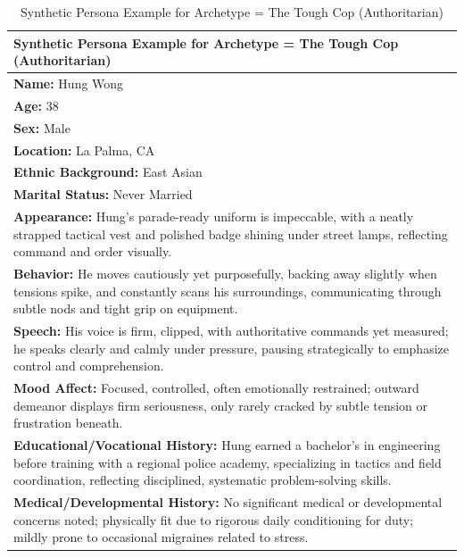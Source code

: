 \documentclass[11pt]{article}
\begin{document}
\begin{table}[ht]
\centering
\caption{Synthetic Persona Example for Archetype = The Tough Cop (Authoritarian)}
\label{tab:persona-example-2}
\scriptsize %
\begin{tabularx}{\textwidth}{X}
\toprule
\textbf{Synthetic Persona Example for Archetype = The Tough Cop (Authoritarian)} \\
\midrule
\textbf{Name:} Hung Wong \\
\textbf{Age:} 38 \\
\textbf{Sex:} Male \\
\textbf{Location:} La Palma, CA \\
\textbf{Ethnic Background:} East Asian \\
\textbf{Marital Status:} Never Married \\[4pt]

\textbf{Appearance:} Hung's parade-ready uniform is impeccable, with a neatly strapped tactical vest and polished badge shining under street lamps, reflecting command and order visually. \\[4pt]

\textbf{Behavior:} He moves cautiously yet purposefully, backing away slightly when tensions spike, and constantly scans his surroundings, communicating through subtle nods and tight grip on equipment. \\[4pt]

\textbf{Speech:} His voice is firm, clipped, with authoritative commands yet measured; he speaks clearly and calmly under pressure, pausing strategically to emphasize control and comprehension. \\[4pt]

\textbf{Mood Affect:} Focused, controlled, often emotionally restrained; outward demeanor displays firm seriousness, only rarely cracked by subtle tension or frustration beneath. \\[4pt]

\textbf{Educational/Vocational History:} Hung earned a bachelor's in engineering before training with a regional police academy, specializing in tactics and field coordination, reflecting disciplined, systematic problem-solving skills. \\[4pt]

\textbf{Medical/Developmental History:} No significant medical or developmental concerns noted; physically fit due to rigorous daily conditioning for duty; mildly prone to occasional migraines related to stress. \\[4pt]


\end{tabularx}
\end{table}
\end{document}
